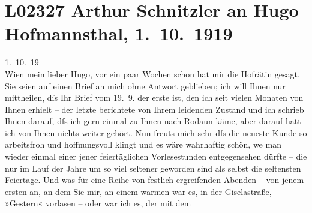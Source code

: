 

\section[Arthur Schnitzler an Hugo Hofmannsthal, 1. 10. 1919]{L02327 Arthur Schnitzler an Hugo Hofmannsthal, 1. 10. 1919}
\nopagebreak{}
\rehead{ }\normalsize\beginnumbering{}
\toendnotes[C]{\smallbreak\pagebreak[2]}
\toendnotes[C]{\smallbreak}
\pstart
           \raggedleft{}{\pb}1. 10. 19{\\}Wien\pend
           \vspace{0.5em}
\pstart
           mein lieber Hugo, vor ein paar Wochen schon hat mir die Hofrätin gesagt, Sie seien auf einen Brief an
               mich ohne Antwort geblieben; ich will Ihnen nur mittheilen, dſs Ihr Brief vom
                  19. 9. der erste ist, den ich seit vielen Monaten von Ihnen erhielt –
               der letzte berichtete von Ihrem leidenden Zustand und ich schrieb Ihnen darauf, dſs
               ich gern einmal zu Ihnen nach Rodaun käme, aber
               darauf hatt ich von Ihnen nichts weiter gehört. Nun freuts mich sehr dſs die neueste
               Kunde so arbeitsfroh und hoffnungsvoll klingt und es wäre wahrhaftig schön, we{\geminationn} man wieder einmal einer jener feiertäglichen
               Vorlesestunden entgegensehen dürfte – die nur im Lauf der Jahre um so viel seltener
               geworden sind als selbst die seltensten Feiertage. Und was für eine Reihe von
               festlich ergreifenden Abenden – von jenem ersten an, an dem Sie mir, an einem warmen
                  \label{K_L02327-1v}\label{K_L02327-1} war es, in der Giselastraße, »Gestern« vorlasen – oder war ich es, der mit dem
